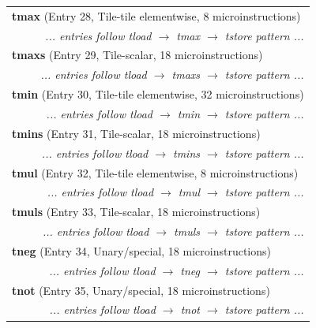 \begin{longtable}{r r r r r r r r}
\multicolumn{8}{l}{\textbf{tmax} (Entry 28, Tile-tile elementwise, 8 microinstructions)} \\
  & \multicolumn{7}{r}{\textit{... entries follow tload $\rightarrow$ tmax $\rightarrow$ tstore pattern ...}} \\

\multicolumn{8}{l}{\textbf{tmaxs} (Entry 29, Tile-scalar, 18 microinstructions)} \\
  & \multicolumn{7}{r}{\textit{... entries follow tload $\rightarrow$ tmaxs $\rightarrow$ tstore pattern ...}} \\

\multicolumn{8}{l}{\textbf{tmin} (Entry 30, Tile-tile elementwise, 32 microinstructions)} \\
  & \multicolumn{7}{r}{\textit{... entries follow tload $\rightarrow$ tmin $\rightarrow$ tstore pattern ...}} \\

\multicolumn{8}{l}{\textbf{tmins} (Entry 31, Tile-scalar, 18 microinstructions)} \\
  & \multicolumn{7}{r}{\textit{... entries follow tload $\rightarrow$ tmins $\rightarrow$ tstore pattern ...}} \\

\multicolumn{8}{l}{\textbf{tmul} (Entry 32, Tile-tile elementwise, 8 microinstructions)} \\
  & \multicolumn{7}{r}{\textit{... entries follow tload $\rightarrow$ tmul $\rightarrow$ tstore pattern ...}} \\

\multicolumn{8}{l}{\textbf{tmuls} (Entry 33, Tile-scalar, 18 microinstructions)} \\
  & \multicolumn{7}{r}{\textit{... entries follow tload $\rightarrow$ tmuls $\rightarrow$ tstore pattern ...}} \\

\multicolumn{8}{l}{\textbf{tneg} (Entry 34, Unary/special, 18 microinstructions)} \\
  & \multicolumn{7}{r}{\textit{... entries follow tload $\rightarrow$ tneg $\rightarrow$ tstore pattern ...}} \\

\multicolumn{8}{l}{\textbf{tnot} (Entry 35, Unary/special, 18 microinstructions)} \\
  & \multicolumn{7}{r}{\textit{... entries follow tload $\rightarrow$ tnot $\rightarrow$ tstore pattern ...}} \\


\end{longtable}
